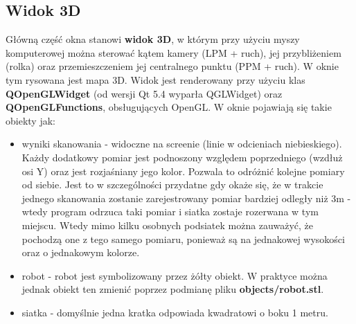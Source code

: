 \documentclass[a4paper]{article}
\begin{document}
\subsection{Widok 3D}
Główną część okna stanowi \textbf{widok 3D}, w którym przy użyciu myszy komputerowej można sterować kątem kamery (LPM + ruch), jej przybliżeniem (rolka) oraz przemieszczeniem jej centralnego punktu (PPM + ruch). W oknie tym rysowana jest mapa 3D.
 Widok jest renderowany przy użyciu klas \textbf{QOpenGLWidget} (od wersji Qt 5.4 wyparła QGLWidget) oraz \textbf{QOpenGLFunctions}, obsługujących OpenGL. W oknie pojawiają się takie obiekty jak:
\begin{itemize}
\item wyniki skanowania - widoczne na screenie (linie w odcieniach niebieskiego). Każdy dodatkowy pomiar jest podnoszony względem poprzedniego (wzdłuż osi Y) oraz jest rozjaśniany jego kolor. Pozwala to odróżnić kolejne pomiary od siebie. Jest to w szczególności przydatne gdy okaże się, że w trakcie jednego skanowania zostanie zarejestrowany pomiar bardziej odległy niż 3m - wtedy program odrzuca taki pomiar i siatka zostaje rozerwana w tym miejscu. Wtedy mimo kilku osobnych podsiatek można zauważyć, że pochodzą one z tego samego pomiaru, ponieważ są na jednakowej wysokości oraz o jednakowym kolorze.
\item robot - robot jest symbolizowany przez żółty obiekt. W praktyce można jednak obiekt ten zmienić poprzez podmianę pliku \textbf{objects/robot.stl}.
\item siatka - domyślnie jedna kratka odpowiada kwadratowi o boku 1 metru. 
\end{itemize}
\end{document}
